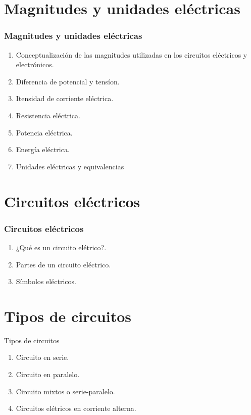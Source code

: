 \documentclass[xcolor=dvipsnames,envcountsect]{beamer}
\begin{document}
\section{Magnitudes y unidades eléctricas}
\begin{frame}
	\frametitle{Magnitudes y unidades eléctricas}
		\justifying
		\begin{enumerate}
		\item Conceptualización de las magnitudes utilizadas en los circuitos eléctricos y electrónicos.
		\item Diferencia de potencial y tensíon.
		\item Itensidad de corriente eléctrica.
		\item Resistencia eléctrica.
		\item Potencia eléctrica.
		\item Energía eléctrica.
		\item Unidades eléctricas y equivalencias
		\end{enumerate}
\end{frame}



\section{Circuitos eléctricos}

\begin{frame}
		\frametitle{Circuitos eléctricos}
		\begin{enumerate}
		\item ¿Qué es un circuito elétrico?.
		\item Partes de un circuito eléctrico.
		\item Símbolos eléctricos.
		\end{enumerate}				
\end{frame}


\section{Tipos de circuitos}
\begin{frame}{Tipos de circuitos}
		\begin{enumerate}
		\item Circuito en serie.
		\item Circuito en paralelo.
		\item Circuito mixtos o serie-paralelo.
		\item Circuitos elétricos en corriente alterna.
		\end{enumerate}		
\end{frame}
\end{document}
